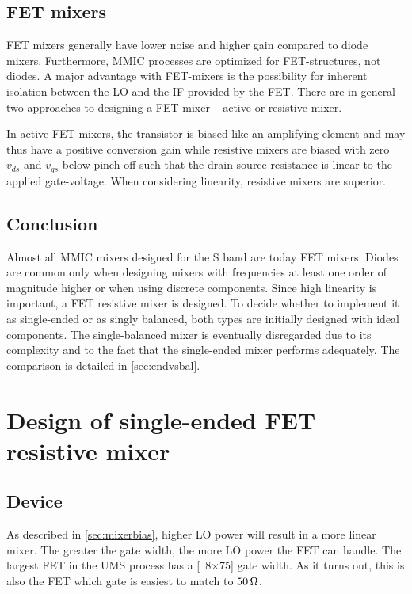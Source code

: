 		\subsection{FET mixers}\label{sec:fet_mixers}
			FET mixers generally have lower noise and higher gain compared to diode mixers. Furthermore, MMIC processes are optimized for FET-structures, not diodes. A major advantage with FET-mixers is the possibility for inherent isolation between the LO and the IF provided by the FET. There are in general two approaches to designing a FET-mixer -- active or resistive mixer.

			In active FET mixers, the transistor is biased like an amplifying element and may thus have a positive conversion gain while resistive mixers are biased with zero $v_{ds}$ and $v_{gs}$ below pinch-off such that the drain-source resistance is linear to the applied gate-voltage. When considering linearity, resistive mixers are superior.\autocites{maas92,maas98}

		\subsection{Conclusion}
			Almost all MMIC mixers designed for the S band are today FET mixers. Diodes are common only when designing mixers with frequencies at least one order of magnitude higher or when using discrete components. Since high linearity is important, a FET resistive mixer is designed. To decide whether to implement it as single-ended or as singly balanced, both types are initially designed with ideal components. The single-balanced mixer is eventually disregarded due to its complexity and to the fact that the single-ended mixer performs adequately. The comparison is detailed in \autoref{sec:endvsbal}.

	\section{Design of single-ended FET resistive mixer}
		\subsection{Device}\label{sec:mixerdevice}
			As described in \autoref{sec:mixerbias}, higher LO power will result in a more linear mixer. The greater the gate width, the more LO power the FET can handle. The largest FET in the UMS process has a \unit[8$\times$75]{\mum} gate width. As it turns out, this is also the FET which gate is easiest to match to $\unit[50]{\Omega}$.\autocite{gustavsson07}


